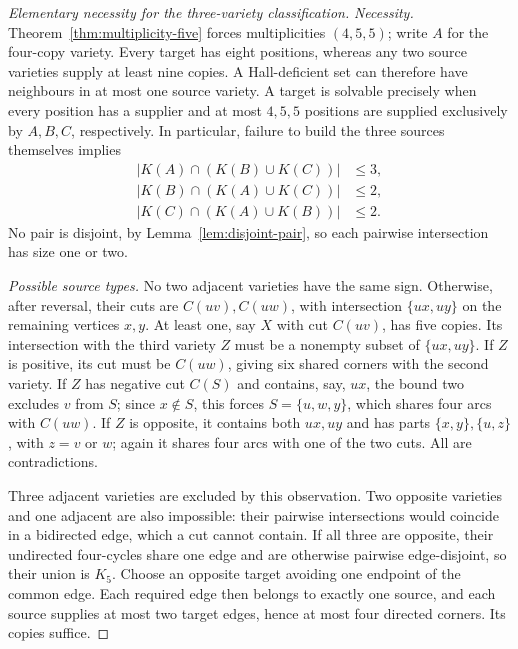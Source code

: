 \begin{proof}[Elementary necessity for the three-variety classification]
\emph{Necessity.} Theorem~\ref{thm:multiplicity-five} forces multiplicities $(4,5,5)$;
write $A$ for the four-copy variety. Every target has eight positions,
whereas any two source varieties supply at least nine copies. A Hall-deficient
set can therefore have neighbours in at most one source variety. A target
is solvable precisely when every position has a supplier and at most
$4,5,5$ positions are supplied exclusively by $A,B,C$, respectively.
In particular, failure to build the three sources themselves implies
\begin{align*}
 |K(A)\cap(K(B)\cup K(C))|&\le3,\\
 |K(B)\cap(K(A)\cup K(C))|&\le2,\\
 |K(C)\cap(K(A)\cup K(B))|&\le2.
\end{align*}
No pair is disjoint, by Lemma~\ref{lem:disjoint-pair}, so each pairwise
intersection has size one or two.

\emph{Possible source types.} No two adjacent varieties have the same sign. Otherwise, after reversal,
their cuts are $C(uv),C(uw)$, with intersection $\{ux,uy\}$ on the remaining
vertices $x,y$. At least one, say $X$ with cut $C(uv)$, has five copies. Its intersection
with the third variety $Z$ must be a nonempty subset of $\{ux,uy\}$.
If $Z$ is positive, its cut must be $C(uw)$, giving six shared corners with
the second variety. If $Z$ has negative cut $C(S)$ and contains, say, $ux$, the bound
two excludes $v$ from $S$; since $x\notin S$, this forces $S=\{u,w,y\}$,
which shares four arcs with $C(uw)$. If $Z$ is opposite, it contains both
$ux,uy$ and has parts $\{x,y\},\{u,z\}$, with $z=v$ or $w$; again it
shares four arcs with one of the two cuts. All are contradictions.

Three adjacent varieties are excluded by this observation. Two opposite
varieties and one adjacent are also impossible: their pairwise intersections
would coincide in a bidirected edge, which a cut cannot contain. If all
three are opposite, their undirected four-cycles share one edge and are
otherwise pairwise edge-disjoint, so their union is $K_5$. Choose an opposite
target avoiding one endpoint of the common edge. Each required edge then
belongs to exactly one source, and each source supplies at most two target
edges, hence at most four directed corners. Its copies suffice.


\end{proof}
